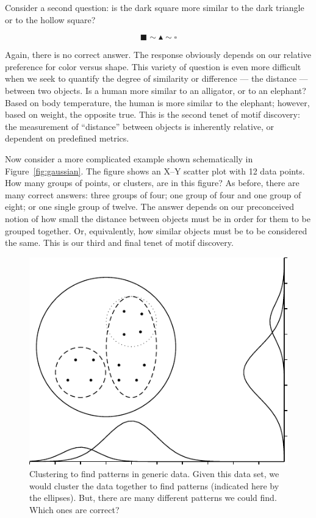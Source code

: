 Consider a second question: is the dark square more similar to the
dark triangle or to the hollow square?

\begin{equation}\label{eqn:shapes2}
    \blacksquare\sim\blacktriangle\sim\square
\end{equation}

Again, there is no correct answer. The response obviously depends on
our relative preference for color versus shape.  This variety of
question is even more difficult when we seek to quantify the degree
of similarity or difference --- the distance --- between two
objects.  Is a human more similar to an alligator, or to an
elephant? Based on body temperature, the human is more similar to
the elephant; however, based on weight, the opposite true.  This is
the second tenet of motif discovery: the measurement of
``distance'' between objects is inherently relative, or dependent on
predefined metrics.

Now consider a more complicated example shown schematically in
Figure~\vref{fig:gaussian}.  The figure shows an X--Y scatter plot
with 12 data points.  How many groups of points, or clusters, are in
this figure?  As before, there are many correct answers: three
groups of four; one group of four and one group of eight; or one
single group of twelve.  The answer depends on our preconceived
notion of how small the distance between objects must be in order
for them to be grouped together.  Or, equivalently, how similar
objects must be to be considered the same.  This is our third and final
tenet of motif discovery.

            \begin{figure}[ptb]
            \centering
            \includegraphics[width=\textwidth]{Body/Images-chap1/gaussian.pdf}
            \caption[Finding patterns in generic data]{Clustering to find patterns in generic data.  Given this data set,
            we would cluster the data together to find patterns (indicated here by the ellipses).  But, there are many different
            patterns we could find.  Which ones are correct?}
            \label{fig:gaussian}
            \end{figure}

